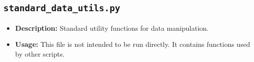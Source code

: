 \documentclass{article}
\begin{document}
\subsection{\texttt{standard\_data\_utils.py}}
\begin{itemize}
    \item \textbf{Description:} Standard utility functions for data manipulation.
    \item \textbf{Usage:} This file is not intended to be run directly. It contains functions used by other scripts.
\end{itemize}
\end{document}
